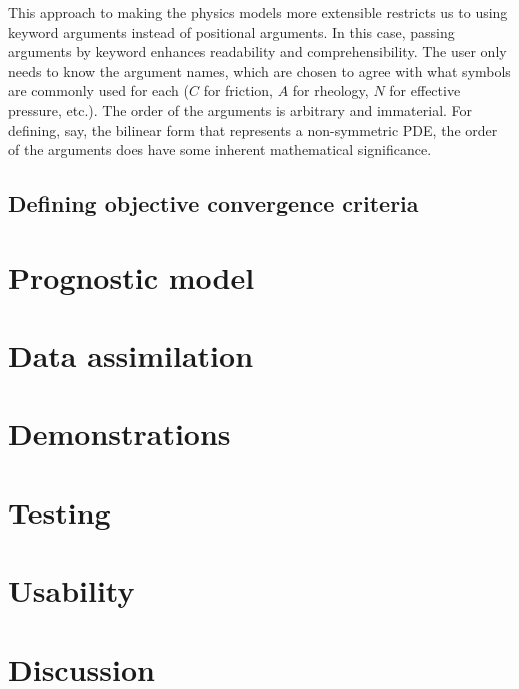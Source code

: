 \documentclass{article}
\theoremstyle{definition}
\theoremstyle{plain}
\begin{document}
This approach to making the physics models more extensible restricts us to using keyword arguments instead of positional arguments.
In this case, passing arguments by keyword enhances readability and comprehensibility.
The user only needs to know the argument names, which are chosen to agree with what symbols are commonly used for each ($C$ for friction, $A$ for rheology, $N$ for effective pressure, etc.).
The order of the arguments is arbitrary and immaterial.
For defining, say, the bilinear form that represents a non-symmetric PDE, the order of the arguments does have some inherent mathematical significance.


\subsection{Defining objective convergence criteria}


\section{Prognostic model}


\section{Data assimilation}


\section{Demonstrations}


\section{Testing}


\section{Usability}


\section{Discussion}



\end{document}
